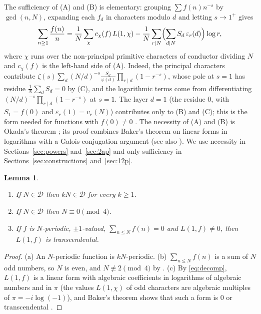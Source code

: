 \documentclass[11pt,a4paper]{article}
\newtheorem{lemma}[theorem]{Lemma}
\theoremstyle{definition}
\theoremstyle{remark}
\newcommand{\cD}{\mathcal{D}}
\begin{document}
The sufficiency of (A) and (B) is elementary: grouping $\sum f(n)n^{-s}$ by $\gcd(n,N)$, expanding each $f_d$ in characters modulo $d$ and letting $s\to1^+$ gives
\begin{equation}\label{eq:decomp}
\sum_{n\ge1}\frac{f(n)}n=\frac1N\sum_{\chi}c_\chi(f)\,L(1,\chi)-\frac1N\sum_{r\mid N}\Bigl(\sum_{d\mid N}S_d\,\varepsilon_r(d)\Bigr)\log r,
\end{equation}
where $\chi$ runs over the non-principal primitive characters of conductor dividing $N$ and $c_\chi(f)$ is the left-hand side of (A). Indeed, the principal characters contribute $\zeta(s)\sum_d(N/d)^{-s}\frac{S_d}{\varphi(d)}\prod_{r\mid d}(1-r^{-s})$, whose pole at $s=1$ has residue $\frac1N\sum_dS_d=0$ by (C), and the logarithmic terms come from differentiating $(N/d)^{-s}\prod_{r\mid d}(1-r^{-s})$ at $s=1$. The layer $d=1$ (the residue $0$, with $S_1=f(0)$ and $\varepsilon_r(1)=v_r(N)$) contributes only to (B) and (C); this is the form needed for functions with $f(0)\neq0$ \cite[Sect.~6]{Kei26c}. The necessity of (A) and (B) is Okada's theorem \cite{Oka82}; its proof combines Baker's theorem on linear forms in logarithms with a Galois-conjugation argument (see also \cite{BBW73,Bha22,Kei26a}). We use necessity in Sections~\ref{sec:powers} and~\ref{sec:2ap} and only sufficiency in Sections~\ref{sec:constructions} and~\ref{sec:12p}.

\begin{lemma}\label{lem:basic}
\begin{enumerate}[label=\textup{(\alph*)}]
\item If $N\in\cD$ then $kN\in\cD$ for every $k\ge1$.
\item If $N\in\cD$ then $N\equiv0\pmod 4$.
\item If $f$ is $N$-periodic, $\pm1$-valued, $\sum_{n\le N}f(n)=0$ and $L(1,f)\ne0$, then $L(1,f)$ is transcendental.
\end{enumerate}
\end{lemma}

\begin{proof}
(a) An $N$-periodic function is $kN$-periodic. (b) $\sum_{n\le N}f(n)$ is a sum of $N$ odd numbers, so $N$ is even, and $N\not\equiv2\pmod4$ by \cite{MP22}. (c) By \eqref{eq:decomp}, $L(1,f)$ is a linear form with algebraic coefficients in logarithms of algebraic numbers and in $\pi$ (the values $L(1,\chi)$ of odd characters are algebraic multiples of $\pi=-i\log(-1)$), and Baker's theorem shows that such a form is $0$ or transcendental \cite{Bak75,BBW73,MS07}.
\end{proof}
\end{document}
